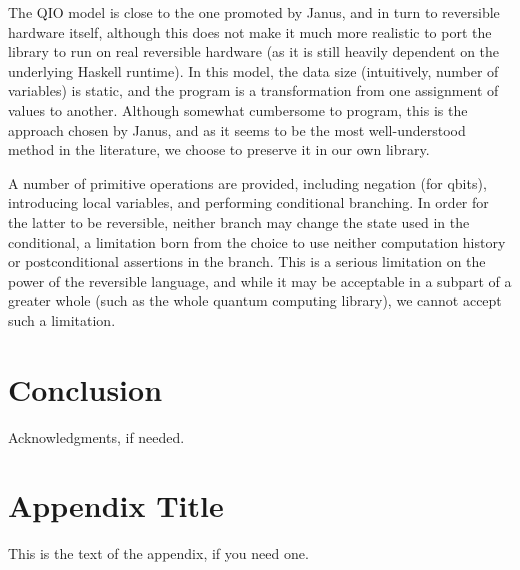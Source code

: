 \documentclass[10pt]{sigplanconf}
\begin{document}
The QIO model is close to the one promoted by Janus, and in turn to
reversible hardware itself, although this does not make it much more
realistic to port the library to run on real reversible hardware (as
it is still heavily dependent on the underlying Haskell runtime).  In
this model, the data size (intuitively, number of variables) is
static, and the program is a transformation from one assignment of
values to another.  Although somewhat cumbersome to program, this is
the approach chosen by Janus, and as it seems to be the most
well-understood method in the literature, we choose to preserve it in
our own library.

A number of primitive operations are provided, including negation (for
qbits), introducing local variables, and performing conditional
branching.  In order for the latter to be reversible, neither branch
may change the state used in the conditional, a limitation born from
the choice to use neither computation history or postconditional
assertions in the branch.  This is a serious limitation on the power
of the reversible language, and while it may be acceptable in a
subpart of a greater whole (such as the whole quantum computing
library), we cannot accept such a limitation.

\section{Conclusion}




\acks
Acknowledgments, if needed.






\appendix
\section{Appendix Title}

This is the text of the appendix, if you need one.
\end{document}
